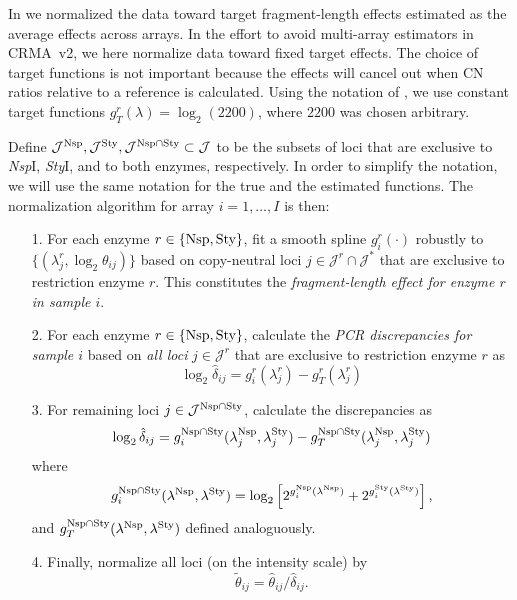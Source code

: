 \documentclass{bioinfo}
\newcommand{\NspI}{\emph{Nsp}I\xspace}
\newcommand{\StyI}{\emph{Sty}I\xspace}
\newcommand{\Nsp}{\ensuremath{\textnormal{Nsp}}\xspace}
\newcommand{\Sty}{\ensuremath{\textnormal{Sty}}\xspace}
\begin{document}
In \citet{BengtssonH_etal_2008a} we normalized the data toward target fragment-length effects estimated as the average effects across arrays.  
In the effort to avoid multi-array estimators in CRMA~v2, we here normalize data toward fixed target effects.  
The choice of target functions is not important because the effects will cancel out when CN ratios relative to a reference is calculated.
Using the notation of \citet{BengtssonH_etal_2008a}, we use constant target functions $g_T^r(\lambda) = \log_2(2200)$, where $2200$ was chosen arbitrary.

Define $\mathcal{J}^{\Nsp}, \mathcal{J}^{\Sty}, \mathcal{J}^{\Nsp\cap\Sty} \subset \mathcal{J}$ to be the subsets of loci that are exclusive to \NspI, \StyI, and to both enzymes, respectively.
In order to simplify the notation, we will use the same notation for the true and the estimated functions.  The normalization algorithm for array $i=1,\ldots,I$ is then:
\begin{enumerate}
 \item[1.] For each enzyme $r \in \{\Nsp, \Sty\}$, fit a smooth spline $g^{r}_{i}(\cdot)$ robustly to $\{(\lambda^{r}_{j}, \log_2\theta_{ij})\}$ based on copy-neutral loci $j \in \mathcal{J}^{r} \cap \mathcal{J^*}$ that are exclusive to restriction enzyme $r$.  This constitutes the \emph{fragment-length effect for enzyme $r$ in sample $i$}.

 \item[2.] For each enzyme $r \in \{\Nsp, \Sty\}$, calculate the \emph{PCR discrepancies for sample $i$} based on \emph{all loci} $j \in \mathcal{J}^{r}$ that are exclusive to restriction enzyme $r$ as
  \begin{equation}
    \log_2 \hat{\delta}_{ij} 
     = g^{r}_{i}(\lambda^{r}_{j}) - g^{r}_{T}(\lambda^{r}_{j})
    \label{eqnPCRbias}
  \end{equation}

 \item[3.] For remaining loci $j \in \mathcal{J}^{\Nsp\cap\Sty}$, calculate the discrepancies as
  \begin{equation}
    \log_2 \hat{\delta}_{ij} 
     = g^{\Nsp\cap\Sty}_{i}(\lambda^{\Nsp}_{j}, \lambda^{\Sty}_{j}) - g^{\Nsp\cap\Sty}_{T}(\lambda^{\Nsp}_{j}, \lambda^{\Sty}_{j})
    \label{eqnPCRbiasIIIa}
  \end{equation}
  where
  \begin{equation}
    g^{\Nsp\cap\Sty}_{i}(\lambda^{\Nsp}, \lambda^{\Sty}) = \log_2\left[
      2^{g^{\Nsp}_{i}(\lambda^{\Nsp})} + 2^{g^{\Sty}_{i}(\lambda^{\Sty})}
    \right],
    \label{eqnPCRbiasIIIb}
  \end{equation}
  and $g^{\Nsp\cap\Sty}_{T}(\lambda^{\Nsp}, \lambda^{\Sty})$ defined analoguously.


 \item[4.] Finally, normalize all loci (on the intensity scale) by
  \begin{equation}
    \tilde{\theta}_{ij} = \hat\theta_{ij} / \hat{\delta}_{ij}.
    \label{eqnPCRnorm}
  \end{equation}
\end{enumerate}
\end{document}
